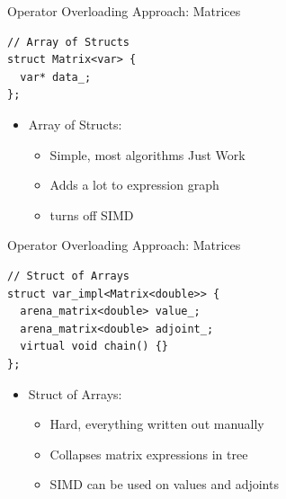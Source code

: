 \documentclass[dvipsnames]{beamer}
\begin{document}
\begin{frame}[fragile]{Operator Overloading Approach: Matrices}
\begin{verbatim}
// Array of Structs
struct Matrix<var> {
  var* data_;
};
\end{verbatim}
\begin{itemize}
    \item Array of Structs:
    \begin{itemize}
        \item Simple, most algorithms Just Work\texttrademark
        \item Adds a lot to expression graph
        \item turns off SIMD
    \end{itemize}
\end{itemize}
\end{frame}

\begin{frame}[fragile]{Operator Overloading Approach: Matrices}
\begin{verbatim}
// Struct of Arrays
struct var_impl<Matrix<double>> {
  arena_matrix<double> value_;
  arena_matrix<double> adjoint_;
  virtual void chain() {}
};
\end{verbatim}
\begin{itemize}
    \item Struct of Arrays:
    \begin{itemize}
        \item Hard, everything written out manually
        \item Collapses matrix expressions in tree
        \item SIMD can be used on values and adjoints
    \end{itemize}
\end{itemize}
\end{frame}
\end{document}
